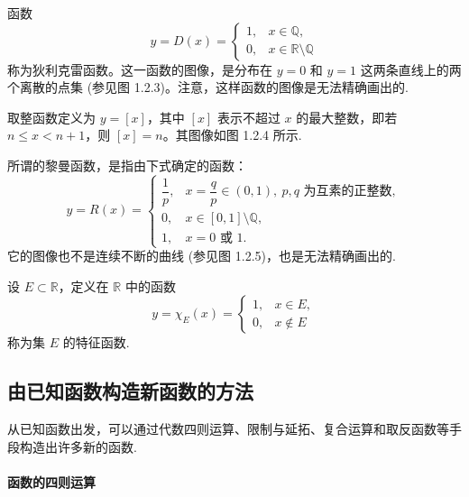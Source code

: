 \begin{example}\label{example:ma-1-2-2}
函数
\[
  y=D(x)=
  \begin{cases}
    1, & x\in\mathbb{Q},\\
    0, & x\in\mathbb{R}\setminus\mathbb{Q}
  \end{cases}
\]
称为狄利克雷函数。这一函数的图像，是分布在 $y=0$ 和 $y=1$ 这两条直线上的两个离散的点集 (参见图 1.2.3)。注意，这样函数的图像是无法精确画出的.
\end{example}


\begin{example}\label{example:ma-1-2-3}
取整函数定义为 $y=[x]$，其中 $[x]$ 表示不超过 $x$ 的最大整数，即若 $n\leqslant x<n+1$，则 $[x]=n$。其图像如图 1.2.4 所示.
\end{example}


\begin{example}[{黎曼 (Riemann) 函数}]\label{example:ma-1-2-4}
所谓的黎曼函数，是指由下式确定的函数：
\[
  y=R(x)=
  \begin{cases}
    \dfrac1p, & x=\dfrac qp\in(0,1),\ p,q\text{ 为互素的正整数},\\
    0, & x\in[0,1]\setminus\mathbb{Q},\\
    1, & x=0\text{ 或 }1.
  \end{cases}
\]
它的图像也不是连续不断的曲线 (参见图 1.2.5)，也是无法精确画出的.
\end{example}


\begin{example}[{特征函数}]\label{example:ma-1-2-5}
设 $E\subset\mathbb{R}$，定义在 $\mathbb{R}$ 中的函数
\[
  y=\chi_E(x)=
  \begin{cases}
    1, & x\in E,\\
    0, & x\notin E
  \end{cases}
\]
称为集 $E$ 的特征函数.
\end{example}


\subsection{由已知函数构造新函数的方法}
\label{subsec:ma-1-2-2}

从已知函数出发，可以通过代数四则运算、限制与延拓、复合运算和取反函数等手段构造出许多新的函数.

\paragraph*{函数的四则运算}


